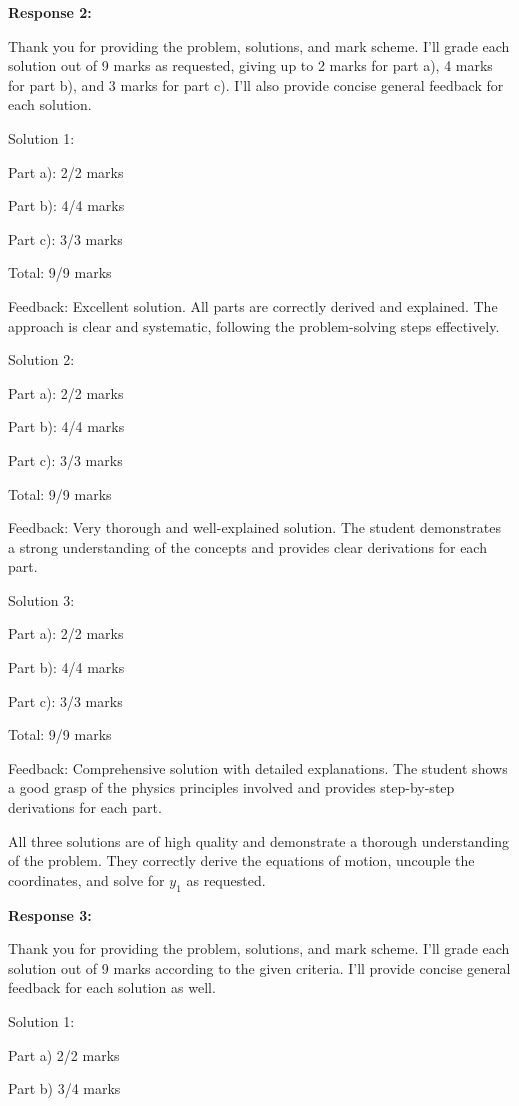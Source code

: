 \documentclass[a4paper,11pt]{article}
\begin{document}
\bigskip
\textbf{Response 2:}

Thank you for providing the problem, solutions, and mark scheme. I'll grade each solution out of 9 marks as requested, giving up to 2 marks for part a), 4 marks for part b), and 3 marks for part c). I'll also provide concise general feedback for each solution.

Solution 1:

Part a): 2/2 marks

Part b): 4/4 marks

Part c): 3/3 marks

Total: 9/9 marks

Feedback: Excellent solution. All parts are correctly derived and explained. The approach is clear and systematic, following the problem-solving steps effectively.

Solution 2:

Part a): 2/2 marks

Part b): 4/4 marks

Part c): 3/3 marks

Total: 9/9 marks

Feedback: Very thorough and well-explained solution. The student demonstrates a strong understanding of the concepts and provides clear derivations for each part.

Solution 3:

Part a): 2/2 marks

Part b): 4/4 marks

Part c): 3/3 marks

Total: 9/9 marks

Feedback: Comprehensive solution with detailed explanations. The student shows a good grasp of the physics principles involved and provides step-by-step derivations for each part.

All three solutions are of high quality and demonstrate a thorough understanding of the problem. They correctly derive the equations of motion, uncouple the coordinates, and solve for \(y_1\) as requested.

\bigskip
\textbf{Response 3:}

Thank you for providing the problem, solutions, and mark scheme. I'll grade each solution out of 9 marks according to the given criteria. I'll provide concise general feedback for each solution as well.

Solution 1:

Part a) 2/2 marks

Part b) 3/4 marks
\end{document}

